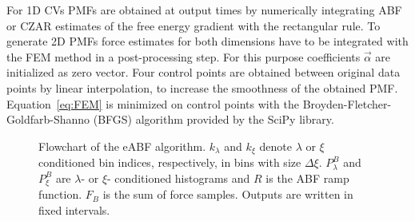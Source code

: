 For 1D CVs PMFs are obtained at output times by numerically integrating ABF or CZAR estimates of the free energy gradient with the rectangular rule.\autocite{davis2007methods}
To generate 2D PMFs force estimates for both dimensions have to be integrated with the FEM method in a post-processing step.
For this purpose coefficients $\vec{\alpha}$ are initialized as zero vector.
Four control points are obtained between original data points by linear interpolation, to increase the smoothness of the obtained PMF.
Equation~\ref{eq:FEM} is minimized on control points with the Broyden-Fletcher-Goldfarb-Shanno (BFGS) algorithm provided by the SciPy library.\autocite{nocedal2006numerical,virtanen2020scipy}

\begin{figure}[H]
   \caption{
     Flowchart of the eABF algorithm. $k_{\lambda}$ and $k_\xi$ denote $\lambda$ or $\xi$ conditioned bin indices, respectively, in bins with size $\Delta\xi$. $P^B_\lambda$ and $P^B_\xi$ are $\lambda$- or $\xi$- conditioned histograms and $R$ is the ABF ramp function. $F_B$ is the sum of force samples. Outputs are written in fixed intervals.
   }
        \centering
\end{figure}
